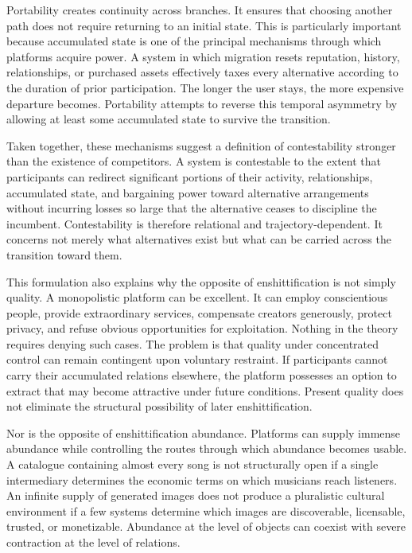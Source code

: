 \documentclass[11pt]{article}
\begin{document}
Portability creates continuity across branches. It ensures that choosing another path does not require returning to an initial state. This is particularly important because accumulated state is one of the principal mechanisms through which platforms acquire power. A system in which migration resets reputation, history, relationships, or purchased assets effectively taxes every alternative according to the duration of prior participation. The longer the user stays, the more expensive departure becomes. Portability attempts to reverse this temporal asymmetry by allowing at least some accumulated state to survive the transition.

Taken together, these mechanisms suggest a definition of contestability stronger than the existence of competitors. A system is contestable to the extent that participants can redirect significant portions of their activity, relationships, accumulated state, and bargaining power toward alternative arrangements without incurring losses so large that the alternative ceases to discipline the incumbent. Contestability is therefore relational and trajectory-dependent. It concerns not merely what alternatives exist but what can be carried across the transition toward them.

This formulation also explains why the opposite of enshittification is not simply quality. A monopolistic platform can be excellent. It can employ conscientious people, provide extraordinary services, compensate creators generously, protect privacy, and refuse obvious opportunities for exploitation. Nothing in the theory requires denying such cases. The problem is that quality under concentrated control can remain contingent upon voluntary restraint. If participants cannot carry their accumulated relations elsewhere, the platform possesses an option to extract that may become attractive under future conditions. Present quality does not eliminate the structural possibility of later enshittification.

Nor is the opposite of enshittification abundance. Platforms can supply immense abundance while controlling the routes through which abundance becomes usable. A catalogue containing almost every song is not structurally open if a single intermediary determines the economic terms on which musicians reach listeners. An infinite supply of generated images does not produce a pluralistic cultural environment if a few systems determine which images are discoverable, licensable, trusted, or monetizable. Abundance at the level of objects can coexist with severe contraction at the level of relations.
\end{document}
